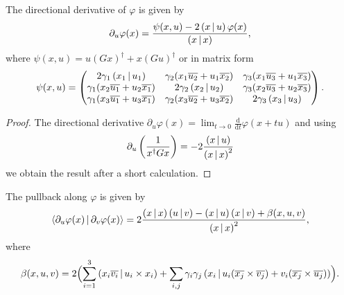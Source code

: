\begin{lemma}
The  directional derivative of $\varphi$ is given by 
\[
\partial_u \varphi(x) = \frac{\psi(x,u) - 2\left( x \,|\, u \right)\varphi(x)}{\left( x \,|\, x \right)},
\]
where $\psi(x,u) = u(Gx)^\dagger + x(Gu)^\dagger$ or in matrix form
\[
\psi(x,u) =
\begin{pmatrix}
2\gamma_1\left( x_1 \,|\, u_1 \right) & \gamma_2(x_1\overline{u_2} + u_1\overline{x_2}) & \gamma_3(x_1\overline{u_3} + u_1\overline{x_3})  \\
\gamma_1(x_2\overline{u_1} + u_2\overline{x_1}) & 2\gamma_2\left( x_2 \,|\, u_2 \right) & \gamma_3(x_2\overline{u_3} + u_2\overline{x_3})  \\
\gamma_1(x_3\overline{u_1} + u_3\overline{x_1}) & \gamma_2(x_3\overline{u_2} + u_3\overline{x_2}) & 2\gamma_3\left( x_3 \,|\, u_3 \right)
\end{pmatrix}.
\]
\end{lemma}
\begin{proof}
The directional derivative $\partial_u \varphi(x) = \lim_{t\to 0} \frac{\mathrm{d}}{\mathrm{d}t} \varphi(x+tu)$ and using  
\[
\partial_u \left( \frac{1}{x^\dagger G x} \right) = - 2\frac{\left( x \,|\, u \right)}{\left( x \,|\, x \right)^2}
\]
we obtain the result after a short calculation.
\end{proof}

\begin{theorem}
The pullback along $\varphi$ is given by
\begin{equation}
\langle \partial_u \varphi(x)\,|\, \partial_v \varphi(x) \rangle = 2\frac{ \left( x \,|\, x \right)\left( u \,|\, v \right) - \left( x \,|\, u \right)\left( x \,|\, v \right) + \beta(x,u,v) }{\left( x \,|\, x \right)^2}, 
\end{equation}
where
\begin{equation}
\beta(x,u,v) =  2\Bigl( \sum_{i=1}^3 \left( x_i\overline{v_i} \,|\, u_i\times x_i \right) + \sum_{i,j} \gamma_i\gamma_j
\left( x_i \,|\, u_i(\overline{x_j}\times \overline{v_j}) + v_i(\overline{x_j}\times \overline{u_j}) \right) \Bigr).
\end{equation}
\end{theorem}


